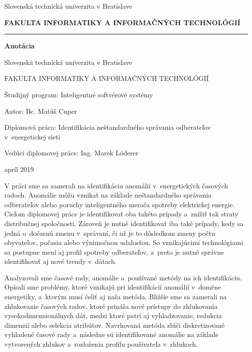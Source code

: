 \documentclass[a4paper,twoside,slovak,12pt,appendix]{article}
\begin{document}
\begin{titlepage}
\begin{center}
  {\small Slovenská technická univerzita v Bratislave \par}
  {\small \textbf{FAKULTA INFORMATIKY A INFORMAČNÝCH TECHNOLÓGIÍ}}
  \rule{\textwidth}{1pt}

  \vspace*{1.5cm}
  \begin{Large}
    \textbf{Anotácia} \par
  \end{Large}
\end{center}
{Slovenská technická univerzita v Bratislave \par}
{FAKULTA INFORMATIKY A INFORMAČNÝCH TECHNOLÓGIÍ \par}
{Študijný program: \indent \indent \indent Inteligentné softvérové systémy \par}
{Autor: \indent \indent \indent \indent \indent \indent \vphantom{} Bc. Matúš Cuper \par}
{Diplomová práca: \indent \indent \indent Identifikácia neštandardného správania odberateľov \\ \indent \indent \indent \indent \indent \indent \indent \indent v~energetickej sieti \par}
{Vedúci diplomovej práce: \hphantom{aa.} Ing. Marek Lóderer \par}
{apríl 2019 \par}
\bigskip
V práci sme sa zamerali na identifikáciu anomálií v~energetických časových
radoch. Anomálie môžu vznikať na základe neštandardného správania odberateľov
alebo poruchy inteligentného merača spotreby elektrickej energie. Cieľom
diplomovej práce je identifikovať oba takéto prípady a~znížiť tak straty
distribučnej spoločnosti. Zároveň je nutné identifikovať iba také prípady, kedy
sa jedná o~dočasnú zmenu v~správaní, či už je to dôsledkom zmeny počtu
obyvateľov, počasia alebo výnimočnou udalosťou. So vznikajúcimi technológiami
sa postupne mení aj profil spotreby odberateľov, a~preto je nutné správne
identifikovať aj nové trendy v~dátach.

Analyzovali sme časové rady, anomálie a~používané metódy na ich identifikáciu.
Opísali sme problémy, ktoré vznikajú pri identifikácií anomálií v~doméne
energetiky, a~ktorým musí čeliť aj naša metóda. Bližšie sme sa zamerali na
zhlukovanie časových radov, ktoré prináša nové prístupy do zhlukovania
vysokodimenzionálnych dát, medzi ktoré patrí aj vyhladzovanie, redukcia dimenzií
alebo selekcia atribútov. Navrhovaná metóda zlúči diskretizované vyhladené
časové rady a~následne sú identifikované anomálie na základe vytvorených zhlukov
a~rozloženia profilu používateľa v~zhlukoch.
\end{titlepage}
\newpage\null\thispagestyle{empty}\newpage
\end{document}
